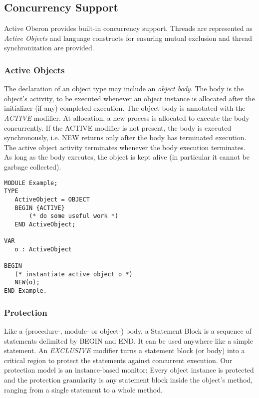 \documentclass[a4paper,11pt]{article}
\begin{document}
\subsection{Concurrency Support}
Active Oberon provides built-in concurrency support. Threads are represented as {\em Active Objects} and language constructs for ensuring mutual exclusion and thread synchronization are provided.

\subsubsection{Active Objects}
The declaration of an object type may include an \emph{object body}. The body is the object's activity, to be executed whenever an object instance is allocated after the initializer (if any) completed execution. The object body is annotated with the \emph{ACTIVE} modifier. At allocation, a new process is allocated to execute the body concurrently.
If the ACTIVE modifier is not present, the body is executed synchronously, i.e. NEW returns only after the body has terminated execution.
The active object activity terminates whenever the body execution terminates. As long as the body executes, the object is kept alive (in particular it cannot be garbage collected).

\begin{lstlisting}[language=Oberon,frame=none,caption=Example of an active object]
MODULE Example;
TYPE
   ActiveObject = OBJECT
   BEGIN {ACTIVE}
       (* do some useful work *)
   END ActiveObject;

VAR
   o : ActiveObject

BEGIN
   (* instantiate active object o *)
   NEW(o);
END Example.
\end{lstlisting}

\subsubsection{Protection}
Like a (procedure-, module- or object-) body, a Statement Block is a sequence of statements delimited by BEGIN and END. It can be used anywhere like a simple statement. An {\em EXCLUSIVE} modifier turns a statement block (or body) into a critical region to protect the statements against concurrent execution. Our protection model is an instance-based monitor: Every object instance is protected and the protection granularity is any statement block inside the object's method, ranging from a single statement to a whole method.
\end{document}
